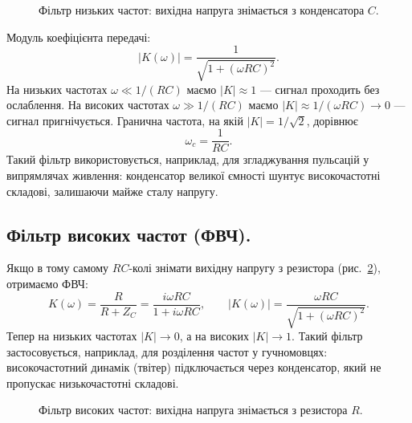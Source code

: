 \begin{figure}
	\centering
	\caption{Фільтр низьких частот: вихідна напруга знімається з конденсатора $C$.}
	\label{tikz:lowpass}
\end{figure}

Модуль коефіцієнта передачі:
\begin{equation}\label{eq:lowpass_magnitude}
	|K(\omega)| = \frac{1}{\sqrt{1 + (\omega RC)^2}}.
\end{equation}
На низьких частотах $\omega \ll 1/(RC)$ маємо $|K| \approx 1$ --- сигнал проходить без ослаблення. На високих частотах $\omega \gg 1/(RC)$ маємо $|K| \approx 1/(\omega RC) \to 0$ --- сигнал пригнічується. Гранична частота, на якій $|K| = 1/\sqrt{2}$, дорівнює
\begin{equation}\label{eq:lowpass_cutoff}
	\omega_c = \frac{1}{RC}.
\end{equation}
Такий фільтр використовується, наприклад, для згладжування пульсацій у випрямлячах живлення: конденсатор великої ємності шунтує високочастотні складові, залишаючи майже сталу напругу.

\subsection*{Фільтр високих частот (ФВЧ).}

Якщо в тому самому $RC$-колі знімати вихідну напругу з резистора (рис.~\ref{tikz:highpass}), отримаємо ФВЧ:
\begin{equation}\label{eq:highpass_transfer}
	K(\omega) = \frac{R}{R + Z_C} = \frac{i\omega RC}{1 + i\omega RC},
	\qquad
	|K(\omega)| = \frac{\omega RC}{\sqrt{1 + (\omega RC)^2}}.
\end{equation}
Тепер на низьких частотах $|K| \to 0$, а на високих $|K| \to 1$. Такий фільтр застосовується, наприклад, для розділення частот у гучномовцях: високочастотний динамік (твітер) підключається через конденсатор, який не пропускає низькочастотні складові.

\begin{figure}
	\centering
	\caption{Фільтр високих частот: вихідна напруга знімається з резистора $R$.}
	\label{tikz:highpass}
\end{figure}

